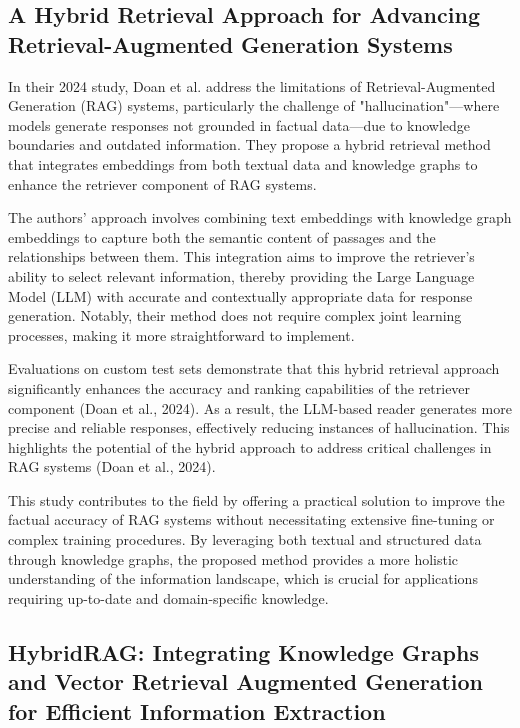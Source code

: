 
\subsection{A Hybrid Retrieval Approach for Advancing Retrieval-Augmented Generation Systems}

\noindent In their 2024 study, Doan et al. address the limitations of Retrieval-Augmented Generation (RAG) systems, particularly the challenge of "hallucination"—where models generate responses not grounded in factual data—due to knowledge boundaries and outdated information. They propose a hybrid retrieval method that integrates embeddings from both textual data and knowledge graphs to enhance the retriever component of RAG systems.

The authors' approach involves combining text embeddings with knowledge graph embeddings to capture both the semantic content of passages and the relationships between them. This integration aims to improve the retriever's ability to select relevant information, thereby providing the Large Language Model (LLM) with accurate and contextually appropriate data for response generation. Notably, their method does not require complex joint learning processes, making it more straightforward to implement.

Evaluations on custom test sets demonstrate that this hybrid retrieval approach significantly enhances the accuracy and ranking capabilities of the retriever component (Doan et al., 2024). As a result, the LLM-based reader generates more precise and reliable responses, effectively reducing instances of hallucination. This highlights the potential of the hybrid approach to address critical challenges in RAG systems (Doan et al., 2024).

This study contributes to the field by offering a practical solution to improve the factual accuracy of RAG systems without necessitating extensive fine-tuning or complex training procedures. By leveraging both textual and structured data through knowledge graphs, the proposed method provides a more holistic understanding of the information landscape, which is crucial for applications requiring up-to-date and domain-specific knowledge.


\subsection{HybridRAG: Integrating Knowledge Graphs and Vector Retrieval Augmented Generation for Efficient Information Extraction}

